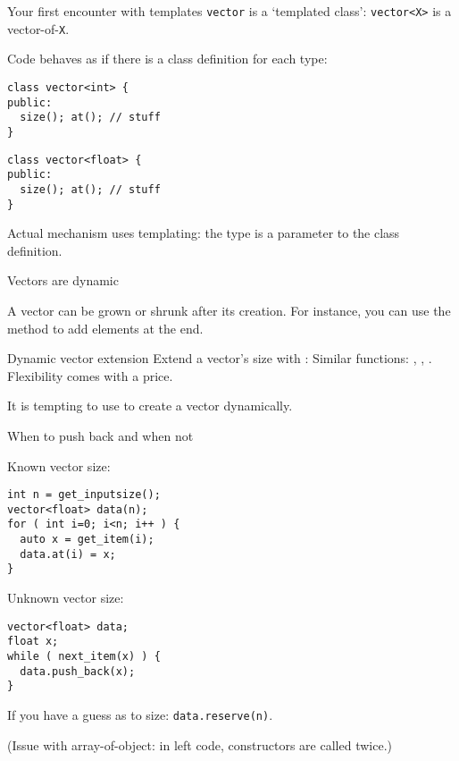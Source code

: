 \begin{block}{Your first encounter with templates}
  \label{sl:vector-template}
 \lstinline{vector} is a `templated class':
    \lstinline{vector<X>} is a vector-of-\lstinline{X}.

    Code behaves as if there is a class definition for each type:
    \begin{multicols}{2}
      \small
\begin{lstlisting}
class vector<int> {
public:
  size(); at(); // stuff
}
\end{lstlisting}
\begin{lstlisting}
class vector<float> {
public:
  size(); at(); // stuff
}
\end{lstlisting}
    \end{multicols}
    Actual mechanism uses templating:
    the type is a parameter to the class definition.
\end{block}

 {Vectors are dynamic}
\label{sec:stdvector-dynamic}

A vector
can be grown or shrunk after its creation.
For instance, you can use the  method to add elements at the end.

\begin{block}{Dynamic vector extension}
  \label{sl:vector-dynamic}
  Extend a vector's size with :
  Similar functions: , , .
  \slidenewline
  Flexibility comes with a price.
\end{block}

It is tempting to use  to create a vector dynamically.

\begin{block}{When to push back and when not}
  \label{sl:vecpushnot}
  \begin{multicols}{2}
    Known vector size:
\begin{lstlisting}
int n = get_inputsize();
vector<float> data(n);
for ( int i=0; i<n; i++ ) {
  auto x = get_item(i);
  data.at(i) = x;
}
\end{lstlisting}
\columnbreak
    Unknown vector size:
\begin{lstlisting}
vector<float> data;
float x;
while ( next_item(x) ) {
  data.push_back(x);
}
\end{lstlisting}
  \end{multicols}
  If you have a guess as to size: \lstinline+data.reserve(n)+.

  (Issue with array-of-object: in left code, constructors are called twice.)
\end{block}

